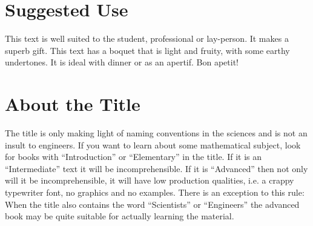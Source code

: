 \section{Suggested Use}

This text is well suited to the student, professional or lay-person.  It 
makes a superb gift.  This text has a boquet that is light and fruity, with
some earthy undertones.  It is ideal with dinner or as an apertif.
Bon apetit!



\section{About the Title}

The title is only making light of naming conventions in the sciences 
and is not an insult to engineers.   If you want to learn about some 
mathematical subject, look for books with ``Introduction'' or ``Elementary''
in the title.  If it is an ``Intermediate'' text it will be incomprehensible.
If it is ``Advanced'' then not only will it be incomprehensible, it will 
have low production qualities, i.e. a crappy typewriter font, no graphics 
and no examples.  There is an exception to this rule:  When the title also 
contains the word ``Scientists'' or ``Engineers'' the advanced book
may be quite suitable for actually learning the material.




